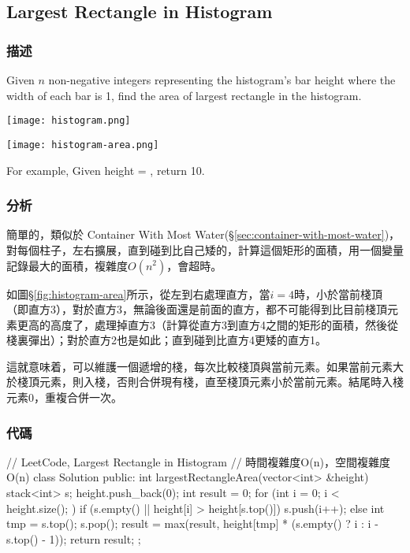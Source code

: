 \subsection{Largest Rectangle in Histogram} %
\label{sec:largest-rectangle-in-histogram}


\subsubsection{描述}
Given $n$ non-negative integers representing the histogram's bar height where the width of each bar is 1, find the area of largest rectangle in the histogram.

\begin{center}
\texttt{[image: histogram.png]}\\
\label{fig:histogram}
\end{center}

\begin{center}
\texttt{[image: histogram-area.png]}\\
\label{fig:histogram-area}
\end{center}

For example,
Given height = \fn{[2,1,5,6,2,3]},
return 10.


\subsubsection{分析}
簡單的，類似於 Container With Most Water(\S \ref{sec:container-with-most-water})，對每個柱子，左右擴展，直到碰到比自己矮的，計算這個矩形的面積，用一個變量記錄最大的面積，複雜度$O(n^2)$，會超時。

如圖\S \ref{fig:histogram-area}所示，從左到右處理直方，當$i=4$時，小於當前棧頂（即直方3），對於直方3，無論後面還是前面的直方，都不可能得到比目前棧頂元素更高的高度了，處理掉直方3（計算從直方3到直方4之間的矩形的面積，然後從棧裏彈出）；對於直方2也是如此；直到碰到比直方4更矮的直方1。

這就意味着，可以維護一個遞增的棧，每次比較棧頂與當前元素。如果當前元素大於棧頂元素，則入棧，否則合併現有棧，直至棧頂元素小於當前元素。結尾時入棧元素0，重複合併一次。


\subsubsection{代碼}
\begin{Code}
// LeetCode, Largest Rectangle in Histogram
// 時間複雜度O(n)，空間複雜度O(n)
class Solution {
public:
    int largestRectangleArea(vector<int> &height) {
        stack<int> s;
        height.push_back(0);
        int result = 0;
        for (int i = 0; i < height.size(); ) {
            if (s.empty() || height[i] > height[s.top()])
                s.push(i++);
            else {
                int tmp = s.top();
                s.pop();
                result = max(result,
                        height[tmp] * (s.empty() ? i : i - s.top() - 1));
            }
        }
        return result;
    }
};
\end{Code}

